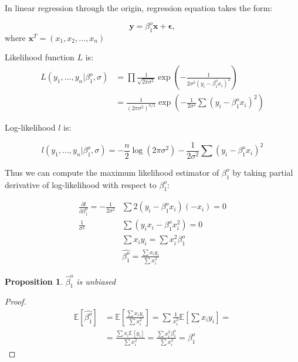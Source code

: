\documentclass[12pt,a4paper,oneside]{book} %
\newtheorem{proposition}[theorem]{Proposition}
\begin{document}
	
	In linear regression through the origin, regression equation takes the form:
	
	\begin{equation}
		\mathbf{y} = \beta_1^o \mathbf{x} + \mathbf{\epsilon},
	\end{equation}
	where $\mathbf{x}^T=(x_1,x_2,...,x_n)$
	
	
	
	Likelihood function $L$ is:
	\begin{align*}
		L(y_1,...,y_n | \beta_1^o, \sigma) &= \prod \frac{1}{\sqrt{2 \pi \sigma^2}} \exp(-\frac{1}{2\sigma^2 (y_i-\beta_1^o x_i)^2}) \\
		&= \frac{1}{(2\pi \sigma^2)^{n/2}}\exp(-\frac{1}{2\sigma^2} \sum (y_i-\beta_1^o x_i)^2)
	\end{align*}

	Log-likelihood $l$ is:

\[
	l(y_1,...,y_n | \beta_1^o, \sigma)=-\frac{n}{2}\log(2\pi \sigma^2)-\frac{1}{2 \sigma^2} \sum (y_i - \beta_1^o x_i)^2
\]

Thus we can compute the maximum likelihood estimator of $\beta_1^o$ by taking partial derivative of log-likelihood with respect to $\beta_1^o$:

\begin{align*}
	\frac{\partial l}{\partial \beta_1^o} = - \frac{1}{2 \sigma^2} & \sum 2(y_i-\beta_1^o x_i)(-x_i)=0 \\
	\frac{1}{\sigma^2}& \sum (y_i x_i - \beta_1^o x_i ^2) = 0 \\
	& \sum x_i y_i =  \sum  x_i^2 \beta_1^o \\
	& \hat{\beta_1^o} = \frac{\sum x_i y_i}{\sum x_i^2}
\end{align*}





	\begin{proposition}
		$\hat{\beta}_1^o$ is unbiased
	\end{proposition}

	\begin{proof}
		\begin{align*}
			\mathbb{E} [\hat{\beta_1^o}] &= \mathbb{E} [\frac{\sum x_i y_i}{\sum x_i^2}] = \sum \frac{1}{x_i^2} \mathbb{E}[\sum x_i y_i] = \\
			&= \frac{\sum x_i\mathbb{E}[y_i]}{\sum x_i^2} = \frac{\sum x_i^2 \beta_1^o}{\sum x_i^2} = \beta_1^o 
		\end{align*}
	\end{proof}
\end{document}

